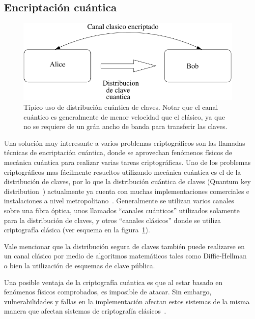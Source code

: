 
\subsection{Encriptación cuántica}

\begin{figure}[t]
  \centering
  \includegraphics[width=0.7 \textwidth]{graphs/quantum} 
  \caption{Típico uso de distribución cuántica de claves. Notar que el canal cuántico es generalmente de menor velocidad que el clásico, ya que no se requiere de un grán ancho de banda para transferir las claves.}
  \label{fig_quant}
\end{figure}


\label{quantcry}
Una solución muy interesante a varios problemas criptográficos son las llamadas técnicas de encriptación cuántica, donde se aprovechan fenómenos físicos de mecánica cuántica para realizar varias tareas criptográficas.
Uno de los problemas criptográficos mas fácilmente resueltos utilizando mecánica cuántica es el de la distribución de claves, por lo que la distribución cuántica de claves (Quantum key distribution~\cite{grosshans2003quantum}) actualmente ya cuenta con muchas implementaciones comerciales e instalaciones a nivel metropolitano~\cite{sasaki2011field}. Generalmente se utilizan varios canales sobre una fibra óptica, unos llamados ``canales cuánticos'' utilizados solamente para la distribución de claves, y otros ``canales clásicos'' donde se utiliza criptografía clásica (ver esquema en la figura~\ref{fig_quant}).

Vale mencionar que la distribución segura de claves también puede realizarse en un canal clásico por medio de algoritmos matemáticos tales como Diffie-Hellman~\cite{diffie1976new} o bien la utilización de esquemas de clave pública.

Una posible ventaja de la criptografía cuántica es que al estar basado en fenómenos físicos comprobados, es imposible de atacar. Sin embargo, vulnerabilidades y fallas en la implementación afectan estos sistemas de la misma manera que afectan sistemas de criptografía clásicos~\cite{lydersen2010hacking}.


